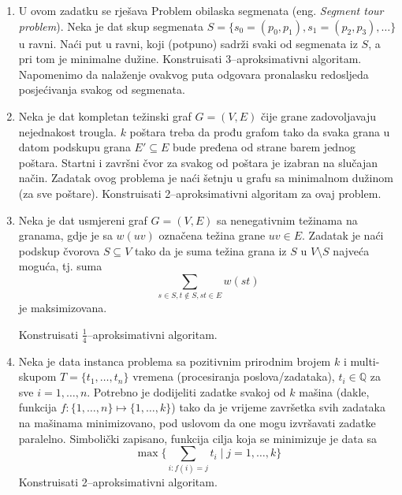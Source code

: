 \documentclass[a4paper, utf8, 11pt, colorlinks]{book}
\theoremstyle{definition}
\begin{document}
\begin{enumerate}
		 \item %
		 U ovom zadatku se rješava Problem obilaska segmenata (eng. \emph{Segment tour problem}). Neka je dat skup segmenata $S = \{s_0 = (p_0, p_1), s_1 =(p_2, p_3),\ldots\}$ u ravni. Naći put u ravni, koji (potpuno) sadrži svaki od segmenata iz $S$, a pri tom je minimalne dužine. Konstruisati 3--aproksimativni algoritam. Napomenimo da nalaženje ovakvog puta odgovara pronalasku redosljeda posjećivanja svakog od segmenata. 
		 \item Neka je dat kompletan težinski graf $G=(V,E)$ čije grane zadovoljavaju nejednakost trougla. $ k$ poštara treba da prođu grafom tako da svaka grana u datom podskupu grana $E' \subseteq E$ bude pređena  od strane barem jednog poštara. Startni i završni čvor za svakog od poštara je izabran na slučajan način. Zadatak ovog problema je naći šetnju u grafu sa minimalnom dužinom (za sve poštare). 
		 Konstruisati 2--aproksimativni algoritam za ovaj problem. 
		 \item %
		 Neka je dat usmjereni graf $G = (V,E) $ sa nenegativnim težinama na granama, gdje je sa $w(uv)$ označena težina grane $uv\in E$. Zadatak je naći podskup čvorova $S \subseteq V$ tako da je suma težina grana iz $S$ u $V\setminus S$ najveća moguća, tj. suma
		  $$ \sum_{s \in S, t \notin S, st \in E }w(st)$$
		  je maksimizovana.  
		  
		  Konstruisati $\frac{1}{4}$--aproksimativni algoritam.
		  
		  
		 \item  %
		 Neka je data instanca problema sa pozitivnim prirodnim  brojem $k$ i multi-skupom 
		 $T = \{t_1,\ldots, t_n\}$ vremena (procesiranja poslova/zadataka), $t_i \in \mathbb{Q}$ za sve $i=1,\ldots, n$. 
		 Potrebno je dodijeliti zadatke svakoj od $k$ mašina (dakle, funkcija $f:\{1,\ldots, n\} \mapsto \{1,\ldots, k\}$) tako da je vrijeme završetka svih zadataka na mašinama minimizovano, pod uslovom da one mogu izvršavati zadatke paralelno. Simbolički zapisano, funkcija cilja koja se minimizuje je data sa 
		 $$\max \{\sum_{i: f(i) = j } t_i \mid j=1,\ldots, k \}$$
		 Konstruisati 2--aproksimativni algoritam.
\end{enumerate}
\end{document}

